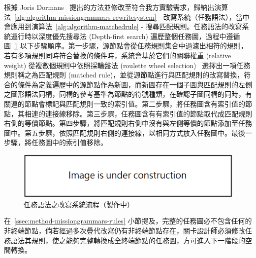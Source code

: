 根據 Joris Dormans~\cite{dormans2010adventures} 提出的方法並修改至符合我方實驗需求，歸納出演算法~\ref{alg:algorithm-missiongrammars-rewritesystem} - 改寫系統（任務語法），當中會應用到演算法~\ref{alg:algorithm-matchedrule} - 搜尋匹配規則。任務語法的改寫系統運行時以深度優先搜尋法 (Depth-first search) 遍歷整個任務圖，過程中遵循圖~\ref{fig:rewrite-system-i-flow} 以下步驟順序。第一步驟，源節點會從任務規則集合中過濾出相符的規則，若有多項規則同時符合替換的條件時，系統會基於它們的關聯權重 (relative weight) 從複數個規則中依照採輪盤法 (roulette wheel selection)~\cite{lipowski2012roulette} 選擇出一項任務規則稱之為匹配規則 (matched rule)，並從源節點進行與匹配規則的改寫替換，符合的條件為定義遍歷中的源節點作為新圖，而新圖存在一個子圖與匹配規則的左側之圖形語法同構，同構的參考基準為節點的符號種類，在確認子圖同構的同時，有關連的節點會標記與匹配規則一致的索引值。第二步驟，將任務圖含有索引值的節點，其相連的連接線移除。第三步驟，任務圖含有有索引值的節點取代成匹配規則右側的等價節點。第四步驟，將匹配規則右側中沒有與左側等價的節點添加至任務圖中。第五步驟，依照匹配規則右側的連接線，以相同方式放入任務圖中。最後一步驟，將任務圖中的索引值移除。

\begin{figure}[!htb]
  \begin{center}
    \includegraphics[width=1.0\textwidth]{figures/under_construction.png}
    \caption{任務語法之改寫系統流程（製作中）}
    \label{fig:rewrite-system-i-flow}
  \end{center}
\end{figure}

在~\ref{ssec:method-missiongrammars-rules} 小節提及，完整的任務圖必不包含任何的非終端節點，倘若經過多次疊代改寫仍有非終端節點存在，關卡設計師必須修改任務語法其規則，使之能夠完整轉換成全終端節點的任務圖，方可進入下一階段的空間轉換。

